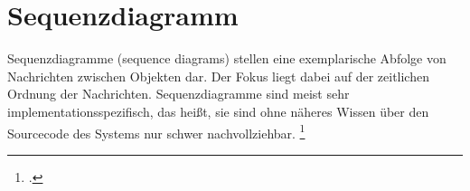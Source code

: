 \documentclass{lehramt-informatik-haupt}
\begin{document}

\chapter{Sequenzdiagramm}

\begin{quellen}
\cite[Seite 401-471]{rupp}
\cite[Zusammengefügtes PDF Seite 115-117 / Kapitel „Assoziationen“ 33-35]{brinda}
\end{quellen}

Sequenzdiagramme (sequence diagrams) stellen eine exemplarische Abfolge
von Nachrichten zwischen Objekten dar. Der Fokus liegt dabei auf der
zeitlichen Ordnung der Nachrichten. Sequenzdiagramme sind meist sehr
implementationsspezifisch, das heißt, sie sind ohne näheres Wissen
über den Sourcecode des Systems nur schwer nachvollziehbar.
\footcite[Seite 167]{schatten}
\end{document}
